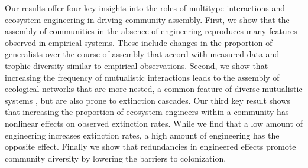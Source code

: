 \documentclass[twocolumn,preprintnumbers,amsmath,amssymb,superscriptaddress,linenumbers]{revtex4-1}
\begin{document}
\begin{bibunit}
Our results offer four key insights into the roles of multitype interactions and ecosystem engineering in driving community assembly.
First, we show that the assembly of communities in the absence of engineering reproduces many features observed in empirical systems.
These include changes in the proportion of generalists over the course of assembly that accord with measured data and trophic diversity similar to empirical observations. %
Second, we show that increasing the frequency of mutualistic interactions leads to the assembly of ecological networks that are more nested, a common feature of diverse mutualistic systems \cite{Bascompte2003}, but are also prone to extinction cascades.
Our third key result shows that increasing the proportion of ecosystem engineers within a community has nonlinear effects on observed extinction rates.
While we find that a low amount of engineering increases extinction rates, a high amount of engineering has the opposite effect.
Finally we show that redundancies in engineered effects promote community diversity by lowering the barriers to colonization.\\



\end{bibunit}
\end{document}
